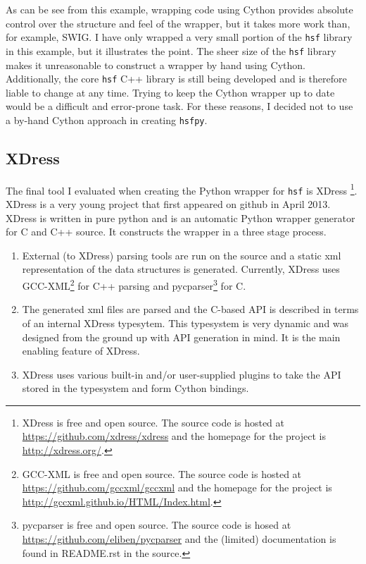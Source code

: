     
    \mainstretch{}

    As can be see from this example, wrapping code using Cython provides absolute control over the structure and feel of the wrapper, but it takes more work than, for example, SWIG. I have only wrapped a very small portion of the \texttt{hsf} library in this example, but it illustrates the point. The sheer size of the \texttt{hsf} library makes it unreasonable to construct a wrapper by hand using Cython. Additionally, the core \texttt{hsf} C++ library is still being developed and is therefore liable to change at any time. Trying to keep the Cython wrapper up to date would be a difficult and error-prone task. For these reasons, I decided not to use a by-hand Cython approach in creating \texttt{hsfpy}.

\subsection{XDress} \label{sub:XDress}

  The final tool I evaluated when creating the Python wrapper for \texttt{hsf} is XDress \footnote{XDress is free and open source. The source code is hosted at \url{https://github.com/xdress/xdress} and the homepage for the project is \url{http://xdress.org/}.}. XDress is a very young project that first appeared on github in April 2013. XDress is written in pure python and is an automatic Python wrapper generator for C and C++ source. It constructs the wrapper in a three stage process.

  \begin{enumerate}
    \item External (to XDress) parsing tools are run on the source and a static xml representation of the data structures is generated. Currently, XDress uses GCC-XML\footnote{GCC-XML is free and open source. The source code is hosted at \url{https://github.com/gccxml/gccxml} and the homepage for the project is \url{http://gccxml.github.io/HTML/Index.html}.} for C++ parsing and pycparser\footnote{pycparser is free and open source. The source code is hosed at \url{https://github.com/eliben/pycparser} and the (limited) documentation is found in README.rst in the source.} for C.
    \item The generated xml files are parsed and the C-based API is described in terms of an internal XDress typesytem. This typesystem is very dynamic and was designed from the ground up with API generation in mind. It is the main enabling feature of XDress.
    \item XDress uses various built-in and/or user-supplied plugins to take the API stored in the typesystem and form Cython bindings.
  \end{enumerate}
  \mainstretch{}

